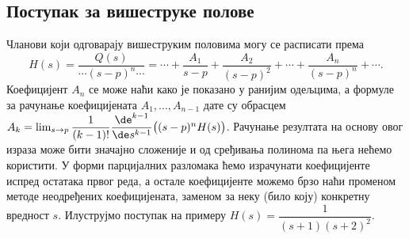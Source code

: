 \begin{center}
    \end{center}


\subsection{Поступак за вишеструке полове}

Чланови који одговарају вишеструким половима могу се расписати према 
\begin{equation}
    H(s) = \dfrac{Q(s)}{\cdots(s - p)^n\cdots} = 
    \cdots
    +
    \dfrac{A_1}{s-p} 
    +
    \dfrac{A_2}{(s-p)^2}
    +
    \cdots
    + 
    \dfrac{A_n}{(s-p)^n}
    +
    \cdots
    .
\end{equation}
Коефицијент $A_n$ се може наћи како је показано у ранијим одељцима, а формуле за рачунање коефицијената 
$A_1, \ldots, A_{n-1}$ дате су обрасцем 
$A_k = \lim_{s \to p} \dfrac{1}{(k-1)!} \dfrac{\de^{k-1}}{\de s^{k-1}} \bigl( (s-p)^n H(s) \bigr)$. 
Рачунање резултата на основу овог израза може бити значајно сложеније и од сређивања полинома па њега нећемо користити. 
У форми парцијалних разломака ћемо израчунати коефицијенте испред остатака првог реда, а остале коефицијенте можемо брзо 
наћи променом методе неодређених коефицијената, заменом за неку (било коју) конкретну вредност $s$. Илуструјмо поступак на примеру
$H(s) = \dfrac{1}{(s+1)(s+2)^2}$.

